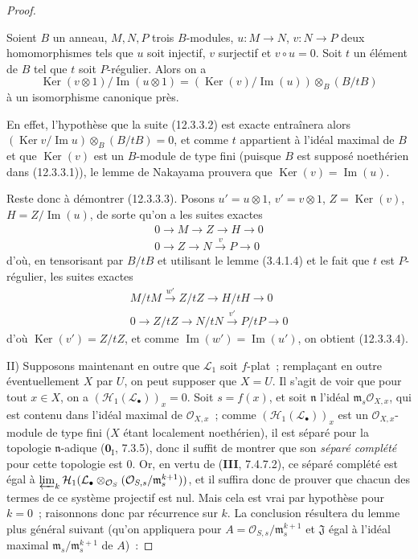 \begin{proof}
\begin{lemma}[12.3.3.3]
\label{IV.12.3.3.3-fr}
Soient $B$ un anneau, $M,N,P$ trois $B$-modules,
$u:M\to N$, $v:N\to P$ deux homomorphismes tels que $u$ soit injectif, $v$
surjectif et $v\circ u=0$. Soit $t$ un élément de $B$ tel que $t$ soit
$P$-régulier. Alors on a
\begin{equation}
  \tag{12.3.3.4}
  \label{IV.12.3.3.4-fr}
  \operatorname{Ker}(v\otimes1)/\operatorname{Im}(u\otimes1)
  =(\operatorname{Ker}(v)/\operatorname{Im}(u))\otimes_B(B/tB)
\end{equation}
à un isomorphisme canonique près.
\end{lemma}

En effet, l'hypothèse que la suite (12.3.3.2) est exacte entraînera alors
$(\operatorname{Ker}v/\operatorname{Im}u)\otimes_B(B/tB)=0$, et comme $t$
appartient à l'idéal maximal de $B$ et que $\operatorname{Ker}(v)$ est un
$B$-module de type fini (puisque $B$ est supposé noethérien dans (12.3.3.1)),
le lemme de Nakayama prouvera que $\operatorname{Ker}(v)=\operatorname{Im}(u)$.

Reste donc à démontrer (12.3.3.3). Posons $u'=u\otimes1$, $v'=v\otimes1$,
$Z=\operatorname{Ker}(v)$, $H=Z/\operatorname{Im}(u)$, de sorte qu'on a les
suites exactes
\begin{gather*}
  0\to M\to Z\to H\to0\\
  0\to Z\to N\xrightarrow{v}P\to0
\end{gather*}
d'où, en tensorisant par $B/tB$ et utilisant le lemme (3.4.1.4) et le fait que
$t$ est $P$-régulier, les suites exactes
\begin{gather*}
  M/tM\xrightarrow{w'}Z/tZ\to H/tH\to0\\
  0\to Z/tZ\to N/tN\xrightarrow{v'}P/tP\to0
\end{gather*}
d'où $\operatorname{Ker}(v')=Z/tZ$, et comme
$\operatorname{Im}(w')=\operatorname{Im}(u')$, on obtient (12.3.3.4).

\medskip
II) Supposons maintenant en outre que $\mathcal L_1$ soit $f$-plat~;
remplaçant en outre éventuellement $X$ par $U$, on peut supposer que $X=U$.
Il s'agit de voir que pour tout $x\in X$, on a
$(\mathcal H_1(\mathcal L_\bullet))_x=0$. Soit $s=f(x)$, et soit
$\mathfrak n$ l'idéal $\mathfrak m_s\mathcal O_{X,x}$, qui est contenu dans
l'idéal maximal de $\mathcal O_{X,x}$~; comme
$(\mathcal H_1(\mathcal L_\bullet))_x$ est un $\mathcal O_{X,x}$-module de type
fini ($X$ étant localement noethérien), il est séparé pour la topologie
$\mathfrak n$-adique ($\mathbf 0_{\mathrm I}$, 7.3.5), donc il suffit de
montrer que son \emph{séparé complété} pour cette topologie est 0. Or, en vertu
de (\textbf{III}, 7.4.7.2), ce séparé complété est égal à
$\varprojlim_k\mathcal H_1(\mathcal L_\bullet\otimes_{\mathcal O_S}
(\mathcal O_{S,s}/\mathfrak m_s^{k+1}))$, et il suffira donc de prouver que
chacun des termes de ce système projectif est nul. Mais cela est vrai par
hypothèse pour $k=0$~; raisonnons donc par récurrence sur $k$. La conclusion
résultera du lemme plus général suivant (qu'on appliquera pour
$A=\mathcal O_{S,s}/\mathfrak m_s^{k+1}$ et $\mathfrak J$ égal à l'idéal
maximal $\mathfrak m_s/\mathfrak m_s^{k+1}$ de $A$)~:


\end{proof}
